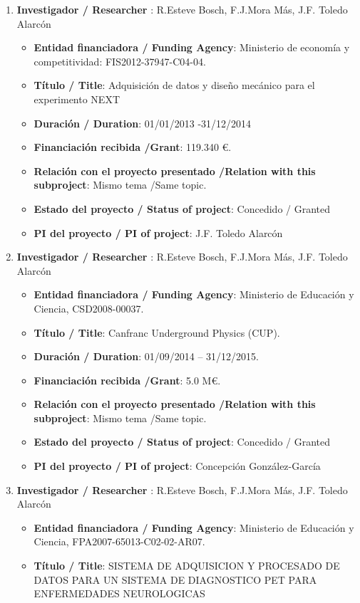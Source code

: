\begin{enumerate}
\item {\bf Investigador / Researcher }: R.Esteve Bosch, F.J.Mora Más, J.F. Toledo Alarcón
\begin{itemize}
\item {\bf Entidad financiadora / Funding Agency}: Ministerio de economía y competitividad: FIS2012-37947-C04-04.
\item {\bf Título / Title}:  Adquisición de datos y diseño mecánico para el experimento NEXT
\item {\bf Duración / Duration}: 01/01/2013 -31/12/2014
\item {\bf Financiación recibida /Grant}: 119.340 \euro. 
\item {\bf Relación con el proyecto presentado /Relation with this subproject}: Mismo tema /Same topic. 
\item {\bf Estado del proyecto / Status of project}: Concedido / Granted
\item {\bf PI del proyecto / PI of project}: J.F. Toledo Alarcón
\end{itemize}
\item {\bf Investigador / Researcher }: R.Esteve Bosch, F.J.Mora Más, J.F. Toledo Alarcón
\begin{itemize}
\item {\bf Entidad financiadora / Funding Agency}: Ministerio de Educaci\'on y Ciencia, CSD2008-00037.
\item {\bf Título / Title}:  Canfranc Underground Physics (CUP).
\item {\bf Duración / Duration}: 01/09/2014 -- 31/12/2015. 
\item {\bf Financiación recibida /Grant}: 5.0 M\euro. 
\item {\bf Relación con el proyecto presentado /Relation with this subproject}: Mismo tema /Same topic. 
\item {\bf Estado del proyecto / Status of project}: Concedido / Granted
\item {\bf PI del proyecto / PI of project}: Concepción González-García 
\end{itemize}
\item {\bf Investigador / Researcher }: R.Esteve Bosch, F.J.Mora Más, J.F. Toledo Alarcón
\begin{itemize}
\item {\bf Entidad financiadora / Funding Agency}: Ministerio de Educaci\'on y Ciencia, FPA2007-65013-C02-02-AR07.
\item {\bf Título / Title}: SISTEMA DE ADQUISICION Y PROCESADO DE DATOS PARA UN SISTEMA DE DIAGNOSTICO PET PARA ENFERMEDADES NEUROLOGICAS

\end{itemize}
\end{enumerate}
